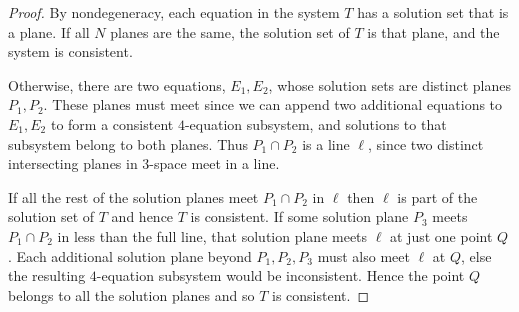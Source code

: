 \documentclass[10pt,a4paper]{amsart}
\begin{document}
\begin{proof}By nondegeneracy, each equation in the system $T$ has a solution set that is a plane. If all $N$ planes are the same, the solution set of $T$ is that plane, and the system is consistent. 

Otherwise, there are two equations, $E_1,E_2$, whose solution sets are distinct planes $P_1,P_2$. These planes must meet since we can append two additional equations to $E_1,E_2$ to form a consistent $4$-equation subsystem, and solutions to that subsystem belong to both planes. Thus $P_1 \cap P_2$ is a line $\ell$, since two distinct intersecting planes in $3$-space meet in a line.

If all the rest of the solution planes meet $P_1 \cap P_2$  in $\ell$ then $\ell$ is part of the solution set of $T$ and hence $T$ is consistent.  If some solution plane $P_3$ meets $P_1 \cap P_2$ in less than the full line, that solution plane meets $\ell$ at just one point $Q$. Each additional solution plane beyond $P_1,P_2,P_3$  must also meet $\ell$ at $Q$, else the resulting $4$-equation subsystem would be inconsistent. Hence the point $Q$ belongs to all the solution planes and so $T$ is consistent.
\end{proof}
\end{document}
